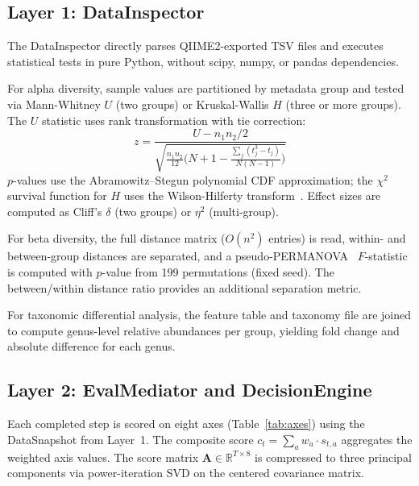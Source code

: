 \documentclass[11pt,a4paper]{article}
\begin{document}
\subsection{Layer 1: DataInspector}

The DataInspector directly parses QIIME2-exported TSV files and
executes statistical tests in pure Python, without scipy, numpy,
or pandas dependencies.

For alpha diversity, sample values are partitioned by metadata group
and tested via Mann-Whitney $U$ (two groups) or Kruskal-Wallis $H$
(three or more groups).
The $U$ statistic uses rank transformation with tie correction:
\begin{equation}
  z = \frac{U - n_1 n_2 / 2}
           {\sqrt{\tfrac{n_1 n_2}{12}
                  \bigl( N + 1 - \tfrac{\sum_j (t_j^3 - t_j)}
                  {N(N-1)} \bigr)}}
\end{equation}
$p$-values use the Abramowitz--Stegun polynomial CDF approximation;
the $\chi^2$ survival function for $H$ uses the Wilson-Hilferty
transform~\citep{wilson1931}.
Effect sizes are computed as Cliff's $\delta$ (two groups) or
$\eta^2$ (multi-group).

For beta diversity, the full distance matrix ($O(n^2)$ entries) is
read, within- and between-group distances are separated, and a
pseudo-PERMANOVA~\citep{anderson2001} $F$-statistic is computed
with $p$-value from 199 permutations (fixed seed).
The between/within distance ratio provides an additional separation
metric.

For taxonomic differential analysis, the feature table and taxonomy
file are joined to compute genus-level relative abundances per
group, yielding fold change and absolute difference for each genus.

\subsection{Layer 2: EvalMediator and DecisionEngine}

Each completed step is scored on eight axes
(Table~\ref{tab:axes}) using the DataSnapshot from Layer~1.
The composite score $c_t = \sum_a w_a \cdot s_{t,a}$ aggregates
the weighted axis values.
The score matrix $\mathbf{A} \in \mathbb{R}^{T \times 8}$ is
compressed to three principal components via power-iteration SVD
on the centered covariance matrix.
\end{document}
